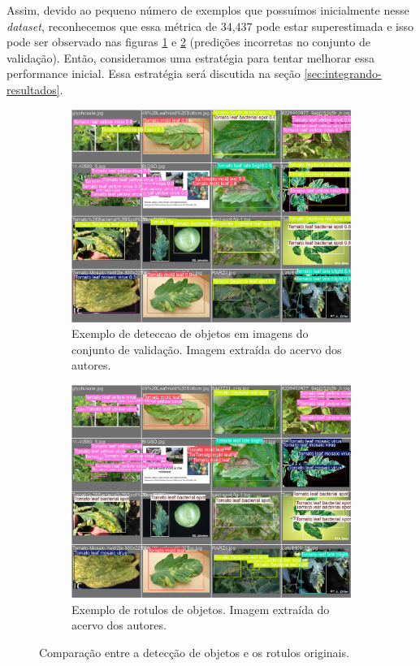 Assim, devido ao pequeno número de exemplos que possuímos inicialmente nesse \emph{dataset}, reconhecemos que essa métrica de 34,437 pode estar superestimada e isso pode ser observado nas figuras \ref{fig:val-pred} e \ref{fig:val-labels} (predições incorretas no conjunto de validação). Então, consideramos uma estratégia para tentar melhorar essa performance inicial. Essa estratégia será discutida na seção \ref{sec:integrando-resultados}.
\begin{figure}[H]
    \centering
    \begin{subfigure}[t]{0.45\textwidth}
        \centering
        \includegraphics[width=\textwidth]{images/val_batch0_pred.jpg}
        \caption{Exemplo de deteccao de objetos em imagens do conjunto de validação. Imagem extraída do acervo dos autores.}
        \label{fig:val-pred} 
    \end{subfigure}\hfill
    \begin{subfigure}[t]{0.45\textwidth}
        \centering
        \includegraphics[width=\textwidth]{images/val_batch0_labels.jpg}
        \caption{Exemplo de rotulos de objetos. Imagem extraída do acervo dos autores.}
        \label{fig:val-labels}
    \end{subfigure}
    \caption{Comparação entre a detecção de objetos e os rotulos originais.}
    \label{fig:comparison}
\end{figure}